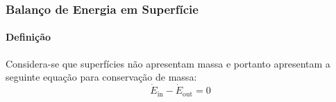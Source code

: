 \documentclass{article}
\begin{document}
        \subsubsection{Balanço de Energia em Superfície}
            \paragraph{Definição}Considera-se que superfícies não apresentam massa e portanto apresentam a seguinte equação para conservação de massa:
                \begin{equation}
                    \boxed{
                        \dot{E}_{\text{in}} - \dot{E}_{\text{out}} = 0
                    }
                \end{equation}
\end{document}
